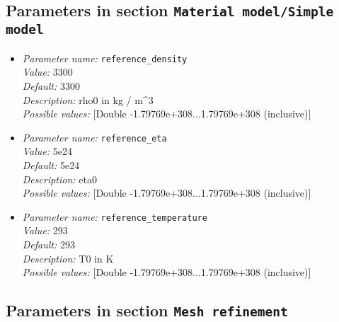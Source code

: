 \subsection{Parameters in section \tt Material model/Simple model}

\begin{itemize}
\item {\it Parameter name:} {\tt reference_density}\\
{\it Value:} 3300\\
{\it Default:} 3300\\
{\it Description:} rho0 in kg / m^3\\
{\it Possible values:} [Double -1.79769e+308...1.79769e+308 (inclusive)]
\item {\it Parameter name:} {\tt reference_eta}\\
{\it Value:} 5e24\\
{\it Default:} 5e24\\
{\it Description:} eta0\\
{\it Possible values:} [Double -1.79769e+308...1.79769e+308 (inclusive)]
\item {\it Parameter name:} {\tt reference_temperature}\\
{\it Value:} 293\\
{\it Default:} 293\\
{\it Description:} T0 in K\\
{\it Possible values:} [Double -1.79769e+308...1.79769e+308 (inclusive)]
\end{itemize}

\subsection{Parameters in section \tt Mesh refinement}


